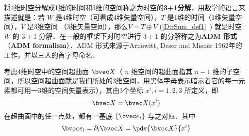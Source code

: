 
\begin{issues}
\issueTODO
\end{issues}

将4维时空分解成1维的时间和3维的空间称之为时空的\textbf{3+1分解}，用数学的语言来描述就是：若 $W$ 是4维时空（可看成4维矢量空间），$T$ 是1维的时间（1维矢量空间），$V$ 是3维空间 （3维矢量空间），那么$V=T\oplus V$ (\autoref{DirSum_def1}~) 就是时空 $W$ 的 $3+1$ 分解．在一般的框架下对时空进行 $3+1$ 的分解称之为\textbf{ADM 形式}（\textbf{ADM formalism}）．ADM 形式来源于Arnowitt, Deser and Misner 1962年的工作，并以三人的首字母命名．

考虑4维时空中的空间超曲面 $\bvec X$（ $n$ 维空间的超曲面指其 $n-1$ 维的子空间，所以空间超曲面就是我们所处的3维空间，用黑体字母表示暗示着它的每一元素都可用一3维的空间矢量表示），其由3个坐标 $x^i,i=1,2,3$ 所定义，即 
\begin{equation}
\bvec X=\bvec X(x^i)
\end{equation}
在超曲面中的任一点处，都有一基底 $\{\bvec e_i\}$ 与之对应．其中
\begin{equation}
\bvec e_i=\partial_i \bvec X=\pdv{\bvec X}{x^i}
\end{equation}
